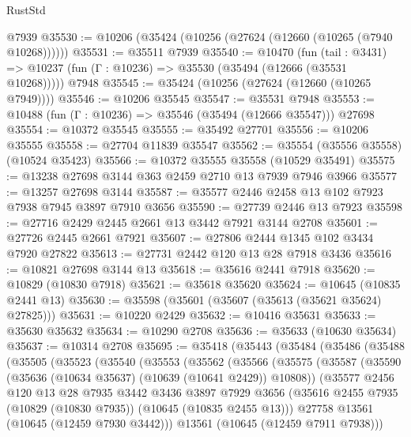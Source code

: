 \begin{lexlean}{RustStd}
\begin{coremodule}
    @7939
@35530 := @10206 (@35424 (@10256 (@27624 (@12660 (@10265 (@7940 @10268))))))
@35531 := @35511 @7939
@35540 := @10470
    (fun (tail : @3431) => @10237 (fun (Γ : @10236) => @35530 (@35494 (@12666 (@35531 @10268)))))
    @7948
@35545 := @35424 (@10256 (@27624 (@12660 (@10265 @7949))))
@35546 := @10206 @35545
@35547 := @35531 @7948
@35553 := @10488 (fun (Γ : @10236) => @35546 (@35494 (@12666 @35547))) @27698
@35554 := @10372 @35545
@35555 := @35492 @27701
@35556 := @10206 @35555
@35558 := @27704 @11839 @35547
@35562 := @35554 (@35556 @35558) (@10524 @35423)
@35566 := @10372 @35555 @35558 (@10529 @35491)
@35575 := @13238 @27698 @3144 @363 @2459 @2710 @13 @7939 @7946 @3966
@35577 := @13257 @27698 @3144
@35587 := @35577 @2446 @2458 @13 @102 @7923 @7938 @7945 @3897 @7910 @3656
@35590 := @27739 @2446 @13 @7923
@35598 := @27716 @2429 @2445 @2661 @13 @3442 @7921 @3144 @2708
@35601 := @27726 @2445 @2661 @7921
@35607 := @27806 @2444 @1345 @102 @3434 @7920 @27822
@35613 := @27731 @2442 @120 @13 @28 @7918 @3436
@35616 := @10821 @27698 @3144 @13
@35618 := @35616 @2441 @7918
@35620 := @10829 (@10830 @7918)
@35621 := @35618 @35620
@35624 := @10645 (@10835 @2441 @13)
@35630 := @35598 (@35601 (@35607 (@35613 (@35621 @35624) @27825)))
@35631 := @10220 @2429
@35632 := @10416 @35631
@35633 := @35630 @35632
@35634 := @10290 @2708
@35636 := @35633 (@10630 @35634)
@35637 := @10314 @2708
@35695 := @35418
    (@35443
      (@35484
        (@35486
          (@35488
            (@35505
              (@35523
                (@35540
                  (@35553
                    (@35562
                      (@35566
                        (@35575
                          (@35587
                            (@35590 (@35636 (@10634 @35637) (@10639 (@10641 @2429)) @10808))
                            (@35577
                              @2456
                              @120
                              @13
                              @28
                              @7935
                              @3442
                              @3436
                              @3897
                              @7929
                              @3656
                              (@35616
                                @2455
                                @7935
                                (@10829 (@10830 @7935))
                                (@10645 (@10835 @2455 @13)))
                              @27758
                              @13561
                              (@10645 (@12459 @7930 @3442)))
                            @13561
                            (@10645 (@12459 @7911 @7938)))

\end{coremodule}
\end{lexlean}
